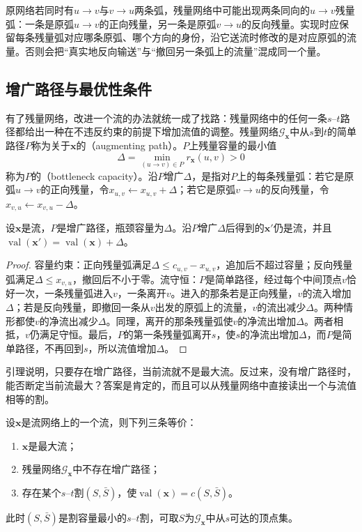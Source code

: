 原网络若同时有$u\to v$与$v\to u$两条弧，残量网络中可能出现两条同向的$u\to v$残量弧：一条是原弧$u\to v$的正向残量，另一条是原弧$v\to u$的反向残量。实现时应保留每条残量弧对应哪条原弧、哪个方向的身份，沿它送流时修改的是对应原弧的流量。否则会把“真实地反向输送”与“撤回另一条弧上的流量”混成同一个量。

\subsection{增广路径与最优性条件}
\label{sec:graph-opt-augmenting-path}

有了残量网络，改进一个流的办法就统一成了找路：残量网络中的任何一条$s$--$t$路径都给出一种在不违反约束的前提下增加流值的调整。残量网络$\mathcal G_{\bm x}$中从$s$到$t$的简单路径$P$称为关于$\bm x$的（augmenting path）。$P$上残量容量的最小值
\[
  \Delta=\min_{(u\to v)\in P}r_{\bm x}(u,v)>0
\]
称为$P$的（bottleneck capacity）。沿$P$增广$\Delta$，是指对$P$上的每条残量弧：若它是原弧$u\to v$的正向残量，令$x_{u,v}\leftarrow x_{u,v}+\Delta$；若它是原弧$v\to u$的反向残量，令$x_{v,u}\leftarrow x_{v,u}-\Delta$。

\begin{lemma}[沿增广路径更新保持可行]
\label{lem:graph-opt-augment}
设$\bm x$是流，$P$是增广路径，瓶颈容量为$\Delta$。沿$P$增广$\Delta$后得到的$\bm x'$仍是流，并且$\operatorname{val}(\bm x')=\operatorname{val}(\bm x)+\Delta$。
\end{lemma}

\begin{proof}
容量约束：正向残量弧满足$\Delta\leq c_{u,v}-x_{u,v}$，追加后不超过容量；反向残量弧满足$\Delta\leq x_{v,u}$，撤回后不小于零。流守恒：$P$是简单路径，经过每个中间顶点$v$恰好一次，一条残量弧进入$v$，一条离开$v$。进入的那条若是正向残量，$v$的流入增加$\Delta$；若是反向残量，即撤回一条从$v$出发的原弧上的流量，$v$的流出减少$\Delta$。两种情形都使$v$的净流出减少$\Delta$。同理，离开的那条残量弧使$v$的净流出增加$\Delta$。两者相抵，$v$仍满足守恒。最后，$P$的第一条残量弧离开$s$，使$s$的净流出增加$\Delta$，而$P$是简单路径，不再回到$s$，所以流值增加$\Delta$。
\end{proof}

引理说明，只要存在增广路径，当前流就不是最大流。反过来，没有增广路径时，能否断定当前流最大？答案是肯定的，而且可以从残量网络中直接读出一个与流值相等的割。

\begin{theorem}[增广路径判据]
\label{thm:graph-opt-augmenting-path}
设$\bm x$是流网络上的一个流，则下列三条等价：
\begin{enumerate}
  \item $\bm x$是最大流；
  \item 残量网络$\mathcal G_{\bm x}$中不存在增广路径；
  \item 存在某个$s$--$t$割$(S,\bar S)$，使$\operatorname{val}(\bm x)=c(S,\bar S)$。
\end{enumerate}
此时$(S,\bar S)$是割容量最小的$s$--$t$割，可取$S$为$\mathcal G_{\bm x}$中从$s$可达的顶点集。
\end{theorem}

